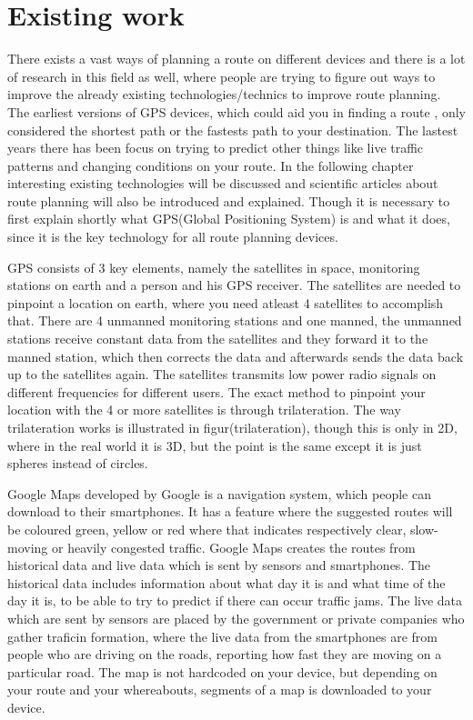 \section{Existing work}
There exists a vast ways of planning a route on different devices and there is  a lot of research in this field as well, where people are trying to figure out ways to improve the already existing technologies/technics to improve route planning. The earliest versions of GPS devices, which could aid you in finding a route , only considered the shortest path or the fastests path to your destination. 
The lastest years there has been focus on trying to predict other things like live traffic patterns and changing conditions on your route.
In the following chapter interesting existing technologies will be discussed and scientific articles about route planning will also be introduced and explained. Though it is necessary to first explain shortly what GPS(Global Positioning System) is and what it does, since it is the key technology for all route planning devices.

GPS consists of 3 key elements, namely the satellites in space, monitoring stations on earth and a person and his GPS receiver. The satellites are needed to pinpoint a location on earth, where you need atleast 4 satellites to accomplish that. 
There are 4 unmanned monitoring stations and one manned, the unmanned stations receive constant data from the satellites and they forward it to the manned station, which then corrects the data and afterwards sends the data back up to the satellites  again. The satellites transmits low power radio signals on different frequencies for different users.
The exact method to pinpoint your location with the 4 or more satellites is through trilateration. The way trilateration works is illustrated in figur(trilateration), though this is only in 2D, where in the real world it is 3D, but the point is the same except it is just spheres instead of circles.


Google Maps developed by Google is a navigation system, which people can download to their smartphones. It has a feature where the suggested routes will be coloured green, yellow or red where that indicates respectively clear, slow-moving or heavily congested traffic. 
Google Maps creates the routes from historical data and live data which is sent by sensors and smartphones. The historical data includes information about what day it is and what time of the day it is, to be able to try to predict if there can occur traffic jams. The live data which are sent by sensors are placed by the government or private companies who gather traficin formation, where the live data from the smartphones are from people who are driving on the roads, reporting how fast they are moving on a particular road. The map is not hardcoded on your device, but depending on your route and your whereabouts, segments of a map is downloaded to your device.

